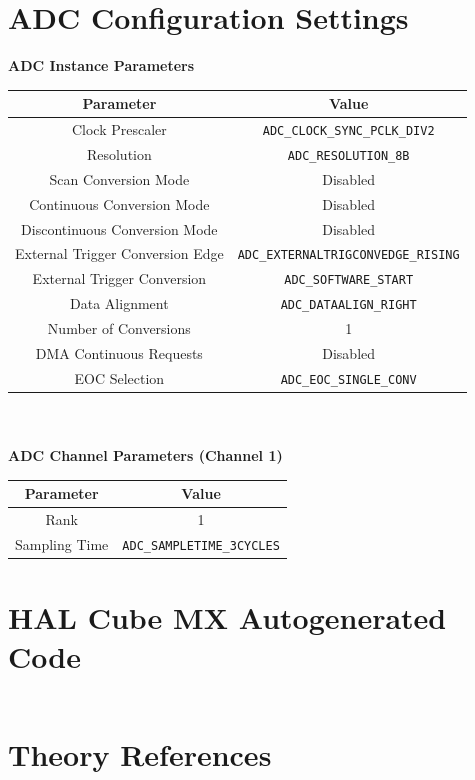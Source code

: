 \documentclass[12pt]{report}
\begin{document}
\begin{appendix}
	\chapter{ADC Configuration Settings}\label{appendixadc}
	\textbf{ADC Instance Parameters}\\
	\begin{tabular}{|c|c|}
		\hline
		Parameter & Value\\\hline
		Clock Prescaler & \texttt{ADC\_CLOCK\_SYNC\_PCLK\_DIV2}\\\hline
		Resolution & \texttt{ADC\_RESOLUTION\_8B}\\\hline
		Scan Conversion Mode & Disabled\\\hline
		Continuous Conversion Mode & Disabled\\\hline
		Discontinuous Conversion Mode & Disabled\\\hline
		External Trigger Conversion Edge & \texttt{ADC\_EXTERNALTRIGCONVEDGE\_RISING}\\\hline
		External Trigger Conversion & \texttt{ADC\_SOFTWARE\_START}\\\hline
		Data Alignment & \texttt{ADC\_DATAALIGN\_RIGHT}\\\hline
		Number of Conversions & 1\\\hline
		DMA Continuous Requests & Disabled\\\hline
		EOC Selection & \texttt{ADC\_EOC\_SINGLE\_CONV}\\\hline
	\end{tabular}
	\newline
	\\\\
	\textbf{ADC Channel Parameters (Channel 1)}\\
	\begin{tabular}{|c|c|}
		\hline
		Parameter & Value\\\hline
		Rank & 1\\\hline
		Sampling Time & \texttt{ADC\_SAMPLETIME\_3CYCLES}\\\hline
	\end{tabular}
	\newpage
	\chapter{HAL Cube MX Autogenerated Code}\label{mammoth}
	\begin{lstlisting}[basicstyle=\scriptsize\ttfamily]
	\end{lstlisting}
	
	\newpage
	\chapter{Theory References}
\end{appendix}
\end{document}

